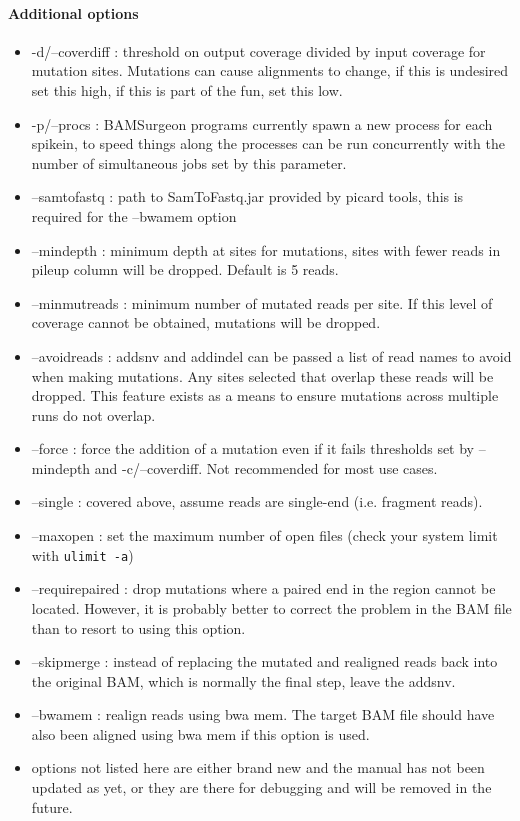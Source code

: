 \documentclass[letterpaper,11pt]{article}
\begin{document}
\paragraph{Additional options}
\begin{itemize}
\item -d/--coverdiff : threshold on output coverage divided by input coverage for mutation sites. Mutations can cause alignments to change, if this is undesired set this high, if this is part of the fun, set this low.
\item -p/--procs : BAMSurgeon programs currently spawn a new process for each spikein, to speed things along the processes can be run concurrently with the number of simultaneous jobs set by this parameter.
\item --samtofastq : path to SamToFastq.jar provided by picard tools, this is required for the --bwamem option
\item --mindepth : minimum depth at sites for mutations, sites with fewer reads in pileup column will be dropped. Default is 5 reads.
\item --minmutreads : minimum number of mutated reads per site. If this level of coverage cannot be obtained, mutations will be dropped.
\item --avoidreads : addsnv and addindel can be passed a list of read names to avoid when making mutations. Any sites selected that overlap these reads will be dropped. This feature exists as a means to ensure mutations across multiple runs do not overlap.
\item --force : force the addition of a mutation even if it fails thresholds set by --mindepth and -c/--coverdiff. Not recommended for most use cases.
\item --single : covered above, assume reads are single-end (i.e. fragment reads).
\item --maxopen : set the maximum number of open files (check your system limit with \texttt{ulimit -a})
\item --requirepaired : drop mutations where a paired end in the region cannot be located. However, it is probably better to correct the problem in the BAM file than to resort to using this option.
\item --skipmerge : instead of replacing the mutated and realigned reads back into the original BAM, which is normally the final step, leave the addsnv.
\item --bwamem : realign reads using bwa mem. The target BAM file should have also been aligned using bwa mem if this option is used.
\item options not listed here are either brand new and the manual has not been updated as yet, or they are there for debugging and will be removed in the future.
\end{itemize}
\end{document}
